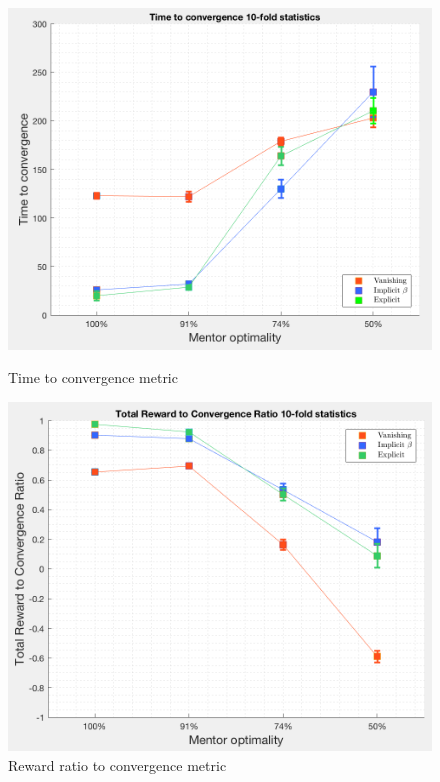 \documentclass[a4paper]{report}
\begin{document}
{{{{				\begin{figure}[ht!]
					\begin{minipage}{0.5\linewidth}
						\includegraphics[width=\linewidth]{tt_metric}
						\caption{Time to convergence metric}
						\label{fig::metric_tt}
					\end{minipage}
					\begin{minipage}{0.5\linewidth}
						\includegraphics[width=\linewidth]{tr_metric}
						\caption{Reward ratio to convergence metric}
						\label{fig::metric_tr}
					\end{minipage}
				\end{figure}	
			}
			
}}}
\end{document}
